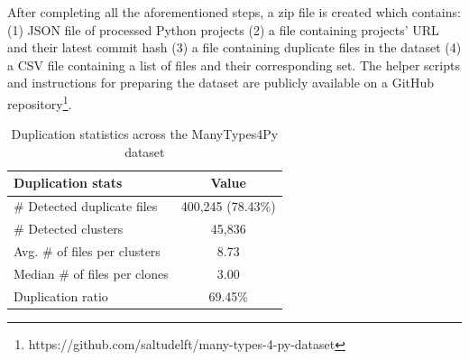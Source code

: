 \documentclass[10pt, conference]{IEEEtran}
\begin{document}
After completing all the aforementioned steps, a zip file is created which contains: (1) JSON file of processed Python projects (2) a file containing projects' URL and their latest commit hash (3) a file containing duplicate files in the dataset (4) a CSV file containing a list of files and their corresponding set. The helper scripts and instructions for preparing the dataset are publicly available on a GitHub repository\footnote{https://github.com/saltudelft/many-types-4-py-dataset}.

\begin{table}[!t]
	\centering
	\caption{Duplication statistics across the ManyTypes4Py dataset}
	\label{tab:dup-stats}
	\begin{tabular}{l c}
		\toprule
		Duplication stats & Value \\
		\midrule
		\# Detected duplicate files & 400,245 (78.43\%) \\
		\# Detected clusters & 45,836 \\
		Avg. \# of files per clusters & 8.73 \\
		Median \# of files per clones & 3.00 \\
		Duplication ratio & 69.45\% \\
		\bottomrule
	\end{tabular}
\end{table}
\end{document}
